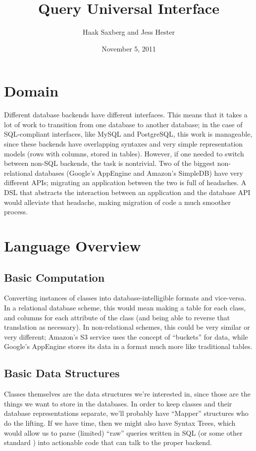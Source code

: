 \documentclass{article} %
\title{Query Universal Interface}
\author{Haak Saxberg and Jess Hester}
\date{November 5, 2011} %
\begin{document}
\maketitle

\section{Domain}
Different database backends have different interfaces. This means that it takes a lot of work to transition from one database
to another database; in the case of SQL-compliant interfaces, like MySQL and PostgreSQL, this work is manageable, since these
backends have overlapping syntaxes and very simple representation models (rows with columns, stored in tables). However, if one
needed to switch between non-SQL backends, the task is nontrivial. Two of the biggest non-relational databases (Google's AppEngine
and Amazon's SimpleDB) have very different APIs; migrating an application between the two is full of headaches. A DSL that abstracts
the interaction between an application and the database API would alleviate that headache, making migration of code a much smoother
process.
\section{Language Overview}
\subsection{Basic Computation}
Converting instances of classes into database-intelligible formats and vice-versa. In a relational database scheme, this would mean making a 
table for each class, and columns for each attribute of the class (and being able to reverse that translation as necessary). In non-relational
schemes, this could be very similar or very different; Amazon's S3 service uses the concept of ``buckets'' for data, while Google's AppEngine
stores its data in a format much more like traditional tables.
\subsection{Basic Data Structures}
Classes themselves are the data structures we're interested in, since those are the things we want to store in the databases. In order to keep
classes and their database representations separate, we'll probably have ``Mapper'' structures who do the lifting. If we have time,
then we might also have Syntax Trees, which would allow us to parse (limited) ``raw'' queries written in SQL (or some other standard ) into 
actionable code that can talk to the proper backend. 
\end{document}
